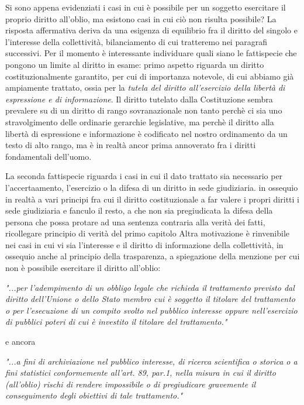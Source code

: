 Si sono appena evidenziati i casi in cui è possibile per un soggetto esercitare il proprio diritto all'oblio, ma esistono casi in cui ciò non risulta possibile? 
La risposta affermativa deriva da una esigenza di equilibrio fra il diritto del singolo e l'interesse della collettività, bilanciamento di cui tratteremo nei paragrafi successivi. 
Per il momento è interessante individuare quali siano le fattispecie che pongono un limite al diritto in esame: primo aspetto riguarda un diritto costituzionalmente garantito, per cui di importanza notevole, di cui abbiamo già ampiamente trattato, ossia per la\textit{ tutela del diritto all'esercizio della libertà di espressione e di informazione}. Il diritto tutelato dalla Costituzione sembra prevalere su di un diritto di rango sovranazionale non tanto perchè ci sia uno stravolgimento delle ordinarie gerarchie legislative, ma perchè il diritto alla libertà di espressione e informazione è codificato nel nostro ordinamento da un testo di alto rango, ma è in realtà ancor prima annoverato fra i diritti fondamentali dell'uomo. 

La seconda fattispecie riguarda i casi in cui il dato trattato sia necessario per l'accertaamento, l'esercizio o la difesa di un diritto in sede giudiziaria. 
in ossequio in realtà a vari principi fra cui il diritto costituzionale a far valere i propri diritti i sede giudiziaria e fanculo il resto, a che non sia pregiudicata la difesa della persona che possa protare ad una sentenza contraria alla verità dei fatti, ricollegare principio di verità del primo capitolo
Altra motivazione è rinvenibile nei casi in cui vi sia l'interesse e il diritto di informazione della collettività, in ossequio anche al principio della trasparenza, a spiegazione della menzione per cui non è possibile esercitare il diritto all'oblio:

\textit{"...per l'adempimento di un obbligo legale che richieda il trattamento previsto dal diritto dell'Unione o dello Stato membro cui è soggetto il titolare del trattamento o per l'esecuzione di un compito svolto nel pubblico interesse oppure nell'esercizio di pubblici poteri di cui è investito il titolare del trattamento."}

e ancora

\textit{"...a fini di archiviazione nel pubblico interesse, di ricerca scientifica o storica o a fini statistici conformemente all'art. 89, par.1, nella misura in cui il diritto (all'oblio) rischi di rendere impossibile o di pregiudicare gravemente il conseguimento degli obiettivi di tale trattamento."}

